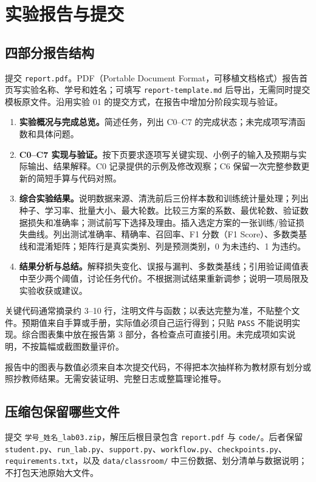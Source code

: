 \documentclass[UTF8,a4paper,11pt,fontset=fandol]{ctexart}
\newcommand{\file}[1]{\nolinkurl{#1}}
\begin{document}
\section{实验报告与提交}
\subsection{四部分报告结构}
提交 \file{report.pdf}。PDF（Portable Document Format，可移植文档格式）报告首页写实验名称、学号和姓名；可填写 \file{report-template.md} 后导出，无需同时提交模板原文件。沿用实验 01 的提交方式，在报告中增加分阶段实现与验证。
\begin{enumerate}
\item \textbf{实验概况与完成总览。}简述任务，列出 C0--C7 的完成状态；未完成项写清函数和具体问题。
\item \textbf{C0--C7 实现与验证。}按下页要求逐项写关键实现、小例子的输入及预期与实际输出、结果解释。C0 记录提供的示例及修改观察；C6 保留一次完整参数更新的简短手算与代码对照。
\item \textbf{综合实验结果。}说明数据来源、清洗前后三份样本数和训练统计量处理；列出种子、学习率、批量大小、最大轮数。比较三方案的系数、最优轮数、验证数据损失和准确率；测试前写下选择及理由。插入选定方案的一张训练/验证损失曲线。列出测试准确率、精确率、召回率、F1 分数（F1 Score）、多数类基线和混淆矩阵；矩阵行是真实类别、列是预测类别，0 为未违约、1 为违约。
\item \textbf{结果分析与总结。}解释损失变化、误报与漏判、多数类基线；引用验证阈值表中至少两个阈值，讨论任务代价。不根据测试结果重新调参；说明一项局限及实验收获或建议。
\end{enumerate}
\begin{teacherbox}[把代码与证据对应起来]
关键代码通常摘录约 3--10 行，注明文件与函数；以表达完整为准，不贴整个文件。预期值来自手算或手册，实际值必须自己运行得到；只贴 \texttt{PASS} 不能说明实现。综合图表集中放在报告第 3 部分，各检查点可直接引用。未完成项如实说明，不按篇幅或截图数量评价。
\end{teacherbox}
报告中的图表与数值必须来自本次提交代码，不得把本次抽样称为教材原有划分或照抄教师结果。无需安装证明、完整日志或整篇理论推导。
\subsection{压缩包保留哪些文件}
提交 \texttt{学号\_\allowbreak{}姓名\_\allowbreak{}lab03.zip}，解压后根目录包含 \file{report.pdf} 与 \file{code/}。后者保留 \file{student.py}、\file{run_lab.py}、\file{support.py}、\file{workflow.py}、\file{checkpoints.py}、\file{requirements.txt}，以及 \file{data/classroom/} 中三份数据、划分清单与数据说明；不打包天池原始大文件。
\end{document}
